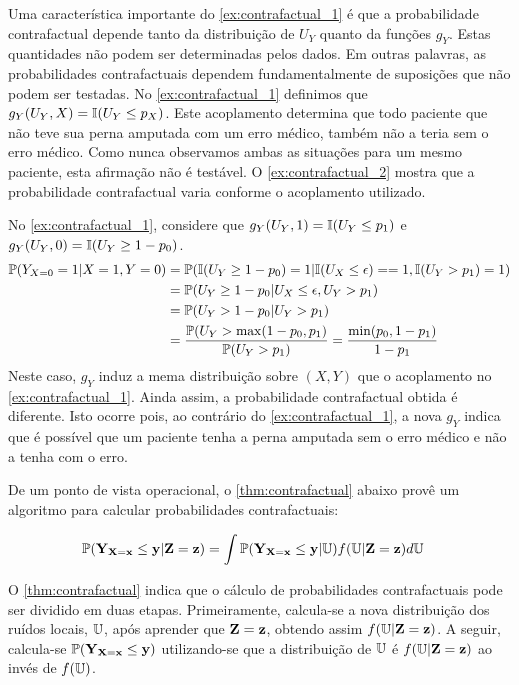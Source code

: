 Uma característica importante do \cref{ex:contrafactual_1} é que 
a probabilidade contrafactual depende 
tanto da distribuição de $U_Y$ quanto da funções $g_Y$.
Estas quantidades não podem ser determinadas pelos dados.
Em outras palavras, as probabilidades contrafactuais dependem
fundamentalmente de suposições que não podem ser testadas.
No \cref{ex:contrafactual_1} definimos que 
$g_Y(U_Y, X) = {\mathbb I}(U_Y \leq p_X)$.
Este acoplamento determina que todo paciente que
não teve sua perna amputada com um erro médico, 
também não a teria sem o erro médico.
Como nunca observamos ambas as situações para
um mesmo paciente, esta afirmação não é testável.
O \cref{ex:contrafactual_2} mostra que
a probabilidade contrafactual varia conforme
o acoplamento utilizado.

\begin{example}
 \label{ex:contrafactual_2}
 No \cref{ex:contrafactual_1}, considere que
 $g_Y(U_Y, 1) = {\mathbb I}(U_Y \leq p_1)$ e
 $g_Y(U_Y, 0) = {\mathbb I}(U_Y \geq 1-p_0)$.
 \begin{align*}
  {\mathbb P}(Y_{X=0}=1|X=1,Y=0)
  &= {\mathbb P}({\mathbb I}(U_Y \geq 1-p_0) = 1|{\mathbb I}(U_X \leq \epsilon) == 1, {\mathbb I}(U_Y > p_1) = 1) \\
  &= {\mathbb P}(U_Y \geq 1-p_0|U_X \leq \epsilon, U_Y > p_1) \\
  &= {\mathbb P}(U_Y > 1-p_0|U_Y > p_1) \\
  &= \frac{{\mathbb P}(U_Y > \max(1-p_0,p_1)}{{\mathbb P}(U_Y > p_1)} = \frac{\min(p_0,1-p_1)}{1-p_1}
 \end{align*}
 Neste caso, $g_Y$ induz a mema distribuição 
 sobre $(X,Y)$ que o acoplamento no \cref{ex:contrafactual_1}.
 Ainda assim, a probabilidade contrafactual obtida é diferente.
 Isto ocorre pois, ao contrário do \cref{ex:contrafactual_1},
 a nova $g_Y$ indica que é possível que um paciente
 tenha a perna amputada sem o erro médico e
 não a tenha com o erro.
\end{example}

De um ponto de vista operacional,
o \cref{thm:contrafactual} abaixo provê
um algoritmo para calcular probabilidades contrafactuais:

\begin{theorem}
 \label{thm:contrafactual}
 \begin{align*}
  {\mathbb P}({\mathbf{Y}}_{{\mathbf{X}}={\mathbf{x}}} \leq {\mathbf{y}}|{\mathbf{Z}}={\mathbf{z}})
  &= \int {\mathbb P}({\mathbf{Y}}_{{\mathbf{X}}={\mathbf{x}}} \leq {\mathbf{y}}|{\mathbb U})f({\mathbb U}|{\mathbf{Z}}={\mathbf{z}})d{\mathbb U}
 \end{align*}
\end{theorem}

O \cref{thm:contrafactual} indica que
o cálculo de probabilidades contrafactuais
pode ser dividido em duas etapas.
Primeiramente, calcula-se a nova distribuição
dos ruídos locais, ${\mathbb U}$, após aprender que
${\mathbf{Z}}={\mathbf{z}}$, obtendo assim $f({\mathbb U}|{\mathbf{Z}}={\mathbf{z}})$.
A seguir, calcula-se 
${\mathbb P}({\mathbf{Y}}_{{\mathbf{X}}={\mathbf{x}}} \leq {\mathbf{y}})$ utilizando-se que
a distribuição de ${\mathbb U}$ é $f({\mathbb U}|{\mathbf{Z}}={\mathbf{z}})$
ao invés de $f({\mathbb U})$.

